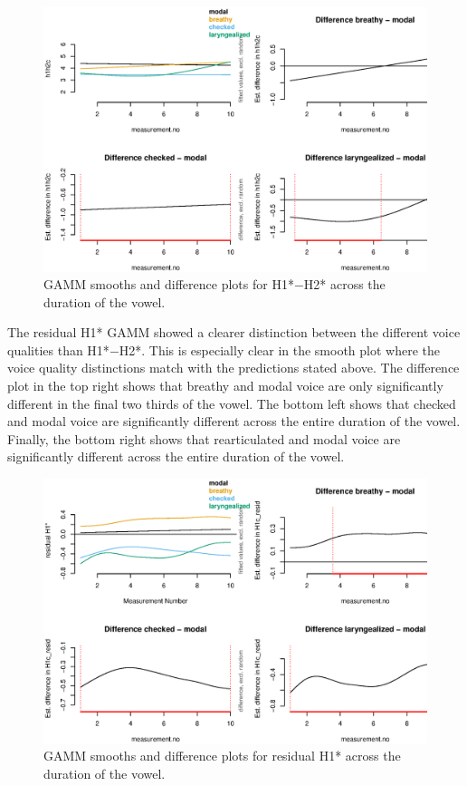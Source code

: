 \begin{figure}[!ht]
  \centering
  \includegraphics[width = \textwidth]{images/h1h2_gamm.eps}
  \caption{GAMM smooths and difference plots for H1*$-$H2* across the duration of the vowel.}
  \label{fig:GAMM_h1h2}
\end{figure}


The residual H1* GAMM showed a clearer distinction between the different voice qualities than H1*$-$H2*. This is especially clear in the smooth plot where the voice quality distinctions match with the predictions stated above. The difference plot in the top right shows that breathy and modal voice are only significantly different in the final two thirds of the vowel. The bottom left shows that checked and modal voice are significantly different across the entire duration of the vowel. Finally, the bottom right shows that rearticulated and modal voice are significantly different across the entire duration of the vowel.
\begin{figure}[!ht]
  \centering
  \includegraphics[width = \textwidth]{images/residh1_gamm.eps}
  \caption{GAMM smooths and difference plots for residual H1* across the duration of the vowel.}
  \label{fig:GAMM_residh1}
\end{figure}

